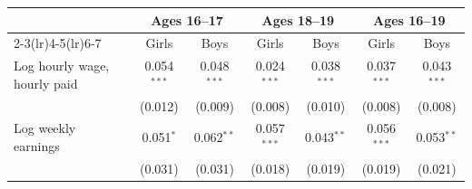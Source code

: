 \begin{tabular}{lcccccc}
\toprule
 & \multicolumn{2}{c}{Ages 16--17} & \multicolumn{2}{c}{Ages 18--19} & \multicolumn{2}{c}{Ages 16--19} \\
\cmidrule(lr){2-3}\cmidrule(lr){4-5}\cmidrule(lr){6-7}
 & Girls & Boys & Girls & Boys & Girls & Boys \\
\midrule
Log hourly wage, hourly paid & 0.054$^{***}$ & 0.048$^{***}$ & 0.024$^{***}$ & 0.038$^{***}$ & 0.037$^{***}$ & 0.043$^{***}$ \\
 & (0.012) & (0.009) & (0.008) & (0.010) & (0.008) & (0.008) \\
Log weekly earnings & 0.051$^{*}$ & 0.062$^{**}$ & 0.057$^{***}$ & 0.043$^{**}$ & 0.056$^{***}$ & 0.053$^{**}$ \\
 & (0.031) & (0.031) & (0.018) & (0.019) & (0.019) & (0.021) \\
\bottomrule
\end{tabular}
